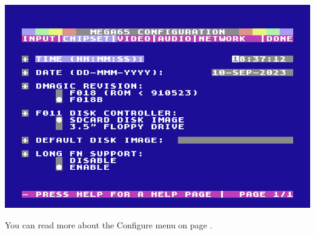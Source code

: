 \begin{center}
\includegraphics[width=0.7\linewidth]{images/ss-m65config-2.png}
\end{center}

You can read more about the Configure menu on page \pageref{sec:configuration-utility}.
